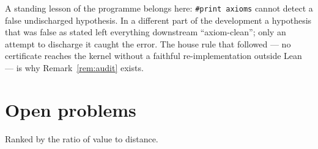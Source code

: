 \documentclass[11pt,reqno]{amsart}
\theoremstyle{plain}
\theoremstyle{definition}
\theoremstyle{remark}
\numberwithin{equation}{section}
\begin{document}
A standing lesson of the programme belongs here: \texttt{\#print axioms} cannot detect a
false undischarged hypothesis. In a different part of the development a hypothesis that was
false as stated left everything downstream ``axiom-clean''; only an attempt to discharge it
caught the error. The house rule that followed --- no certificate reaches the kernel without
a faithful re-implementation outside Lean --- is why Remark~\ref{rem:audit} exists.

\section{Open problems}\label{sec:open}

Ranked by the ratio of value to distance.
\end{document}
